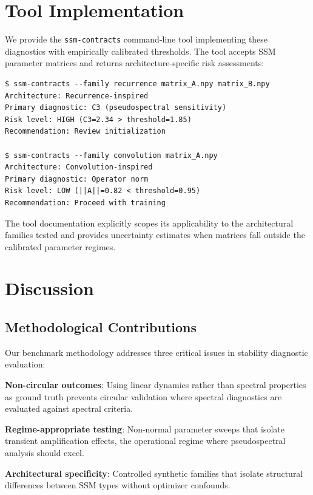 \documentclass[twoside]{article}
\begin{document}
\section{Tool Implementation}

We provide the \texttt{ssm-contracts} command-line tool implementing these diagnostics with empirically calibrated thresholds. The tool accepts SSM parameter matrices and returns architecture-specific risk assessments:

\begin{verbatim}
$ ssm-contracts --family recurrence matrix_A.npy matrix_B.npy
Architecture: Recurrence-inspired
Primary diagnostic: C3 (pseudospectral sensitivity)
Risk level: HIGH (C3=2.34 > threshold=1.85)
Recommendation: Review initialization

$ ssm-contracts --family convolution matrix_A.npy
Architecture: Convolution-inspired
Primary diagnostic: Operator norm
Risk level: LOW (||A||=0.82 < threshold=0.95)
Recommendation: Proceed with training
\end{verbatim}

The tool documentation explicitly scopes its applicability to the architectural families tested and provides uncertainty estimates when matrices fall outside the calibrated parameter regimes.

\section{Discussion}

\subsection{Methodological Contributions}

Our benchmark methodology addresses three critical issues in stability diagnostic evaluation:

\textbf{Non-circular outcomes}: Using linear dynamics rather than spectral properties as ground truth prevents circular validation where spectral diagnostics are evaluated against spectral criteria.

\textbf{Regime-appropriate testing}: Non-normal parameter sweeps that isolate transient amplification effects, the operational regime where pseudospectral analysis should excel.

\textbf{Architectural specificity}: Controlled synthetic families that isolate structural differences between SSM types without optimizer confounds.
\end{document}
